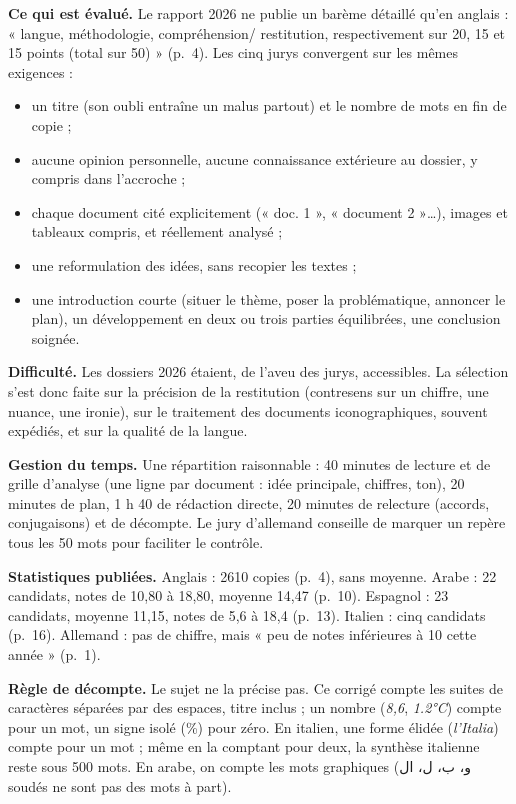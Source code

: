 \documentclass[11pt,a4paper]{article}
\providecommand{\tightlist}{\setlength{\itemsep}{0pt}\setlength{\parskip}{0pt}}
\begin{document}
\textbf{Ce qui est évalué.} Le rapport 2026 ne publie un barème détaillé qu'en anglais : « langue, méthodologie, compréhension/ restitution, respectivement sur 20, 15 et 15 points (total sur 50) » (p.~4). Les cinq jurys convergent sur les mêmes exigences :

\begin{itemize}
\tightlist
\item
  un titre (son oubli entraîne un malus partout) et le nombre de mots en fin de copie ;
\item
  aucune opinion personnelle, aucune connaissance extérieure au dossier, y compris dans l'accroche ;
\item
  chaque document cité explicitement (« doc. 1 », « document 2 »\ldots), images et tableaux compris, et réellement analysé ;
\item
  une reformulation des idées, sans recopier les textes ;
\item
  une introduction courte (situer le thème, poser la problématique, annoncer le plan), un développement en deux ou trois parties équilibrées, une conclusion soignée.
\end{itemize}

\textbf{Difficulté.} Les dossiers 2026 étaient, de l'aveu des jurys, accessibles. La sélection s'est donc faite sur la précision de la restitution (contresens sur un chiffre, une nuance, une ironie), sur le traitement des documents iconographiques, souvent expédiés, et sur la qualité de la langue.

\textbf{Gestion du temps.} Une répartition raisonnable : 40 minutes de lecture et de grille d'analyse (une ligne par document : idée principale, chiffres, ton), 20 minutes de plan, 1 h 40 de rédaction directe, 20 minutes de relecture (accords, conjugaisons) et de décompte. Le jury d'allemand conseille de marquer un repère tous les 50 mots pour faciliter le contrôle.

\textbf{Statistiques publiées.} Anglais : 2610 copies (p.~4), sans moyenne. Arabe : 22 candidats, notes de 10,80 à 18,80, moyenne 14,47 (p.~10). Espagnol : 23 candidats, moyenne 11,15, notes de 5,6 à 18,4 (p.~13). Italien : cinq candidats (p.~16). Allemand : pas de chiffre, mais « peu de notes inférieures à 10 cette année » (p.~1).

\textbf{Règle de décompte.} Le sujet ne la précise pas. Ce corrigé compte les suites de caractères séparées par des espaces, titre inclus ; un nombre (\emph{8,6}, \emph{1.2°C}) compte pour un mot, un signe isolé (\%) pour zéro. En italien, une forme élidée (\emph{l'Italia}) compte pour un mot ; même en la comptant pour deux, la synthèse italienne reste sous 500 mots. En arabe, on compte les mots graphiques (و، ب، ل، ال soudés ne sont pas des mots à part).
\end{document}
